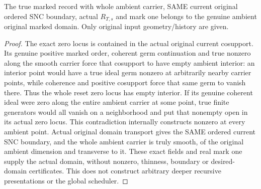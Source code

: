 \begin{theorem}
\label{hir:original-step-one-special-reset-actual-marked-domain}
\leanok
{}
The true marked record with whole ambient carrier, SAME current original
ordered SNC boundary, actual $R_{T,s}$ and mark one belongs to the genuine
ambient original marked domain. Only original input geometry/history are given.
\end{theorem}
\begin{proof}
The exact zero locus is contained in the actual original current cosupport.
Its genuine positive marked order, coherent germ continuation and true nonzero
along the smooth carrier force that cosupport to have empty ambient interior:
an interior point would have a true ideal germ nonzero at arbitrarily nearby
carrier points, while coherence and positive cosupport force that same germ
to vanish there. Thus the whole reset zero locus has empty interior.
If its genuine coherent ideal were zero along the entire ambient carrier at
some point, true finite generators would all vanish on a neighborhood and
put that nonempty open in its actual zero locus. This contradiction internally
constructs nonzero at every ambient point. Actual original domain transport
gives the SAME ordered current SNC boundary, and the whole ambient carrier
is truly smooth, of the original ambient dimension and transverse to it.
These exact fields and real mark one supply the actual domain, without
nonzero, thinness, boundary or desired-domain certificates. This does not
construct arbitrary deeper recursive presentations or the global scheduler.
\end{proof}
